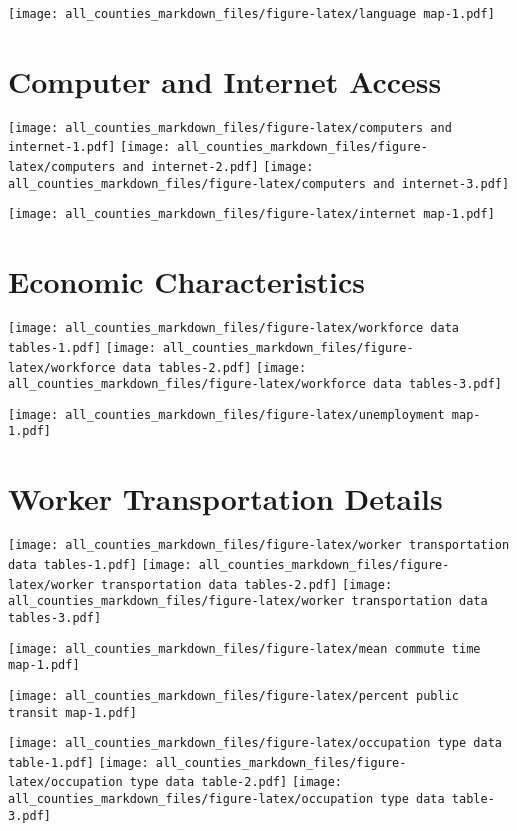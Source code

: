 \documentclass[
]{article}
\begin{document}
\texttt{[image: all\_counties\_markdown\_files/figure-latex/language map-1.pdf]}

\hypertarget{computer-and-internet-access}{%
\section{Computer and Internet
Access}\label{computer-and-internet-access}}

\texttt{[image: all\_counties\_markdown\_files/figure-latex/computers and internet-1.pdf]}
\texttt{[image: all\_counties\_markdown\_files/figure-latex/computers and internet-2.pdf]}
\texttt{[image: all\_counties\_markdown\_files/figure-latex/computers and internet-3.pdf]}

\texttt{[image: all\_counties\_markdown\_files/figure-latex/internet map-1.pdf]}

\hypertarget{economic-characteristics}{%
\section{Economic Characteristics}\label{economic-characteristics}}

\texttt{[image: all\_counties\_markdown\_files/figure-latex/workforce data tables-1.pdf]}
\texttt{[image: all\_counties\_markdown\_files/figure-latex/workforce data tables-2.pdf]}
\texttt{[image: all\_counties\_markdown\_files/figure-latex/workforce data tables-3.pdf]}

\texttt{[image: all\_counties\_markdown\_files/figure-latex/unemployment map-1.pdf]}

\hypertarget{worker-transportation-details}{%
\section{Worker Transportation
Details}\label{worker-transportation-details}}

\texttt{[image: all\_counties\_markdown\_files/figure-latex/worker transportation data tables-1.pdf]}
\texttt{[image: all\_counties\_markdown\_files/figure-latex/worker transportation data tables-2.pdf]}
\texttt{[image: all\_counties\_markdown\_files/figure-latex/worker transportation data tables-3.pdf]}

\texttt{[image: all\_counties\_markdown\_files/figure-latex/mean commute time map-1.pdf]}

\texttt{[image: all\_counties\_markdown\_files/figure-latex/percent public transit map-1.pdf]}

\texttt{[image: all\_counties\_markdown\_files/figure-latex/occupation type data table-1.pdf]}
\texttt{[image: all\_counties\_markdown\_files/figure-latex/occupation type data table-2.pdf]}
\texttt{[image: all\_counties\_markdown\_files/figure-latex/occupation type data table-3.pdf]}
\end{document}

